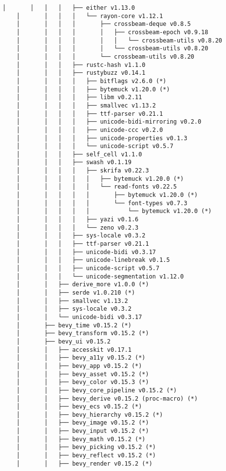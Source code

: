 \begin{lstlisting}[style=mystyle, caption={dependencias del proyecto}, label={lst:dependencias}]
    │       │   │   │   ├── either v1.13.0
    │       │   │   │   └── rayon-core v1.12.1
    │       │   │   │       ├── crossbeam-deque v0.8.5
    │       │   │   │       │   ├── crossbeam-epoch v0.9.18
    │       │   │   │       │   │   └── crossbeam-utils v0.8.20
    │       │   │   │       │   └── crossbeam-utils v0.8.20
    │       │   │   │       └── crossbeam-utils v0.8.20
    │       │   │   ├── rustc-hash v1.1.0
    │       │   │   ├── rustybuzz v0.14.1
    │       │   │   │   ├── bitflags v2.6.0 (*)
    │       │   │   │   ├── bytemuck v1.20.0 (*)
    │       │   │   │   ├── libm v0.2.11
    │       │   │   │   ├── smallvec v1.13.2
    │       │   │   │   ├── ttf-parser v0.21.1
    │       │   │   │   ├── unicode-bidi-mirroring v0.2.0
    │       │   │   │   ├── unicode-ccc v0.2.0
    │       │   │   │   ├── unicode-properties v0.1.3
    │       │   │   │   └── unicode-script v0.5.7
    │       │   │   ├── self_cell v1.1.0
    │       │   │   ├── swash v0.1.19
    │       │   │   │   ├── skrifa v0.22.3
    │       │   │   │   │   ├── bytemuck v1.20.0 (*)
    │       │   │   │   │   └── read-fonts v0.22.5
    │       │   │   │   │       ├── bytemuck v1.20.0 (*)
    │       │   │   │   │       └── font-types v0.7.3
    │       │   │   │   │           └── bytemuck v1.20.0 (*)
    │       │   │   │   ├── yazi v0.1.6
    │       │   │   │   └── zeno v0.2.3
    │       │   │   ├── sys-locale v0.3.2
    │       │   │   ├── ttf-parser v0.21.1
    │       │   │   ├── unicode-bidi v0.3.17
    │       │   │   ├── unicode-linebreak v0.1.5
    │       │   │   ├── unicode-script v0.5.7
    │       │   │   └── unicode-segmentation v1.12.0
    │       │   ├── derive_more v1.0.0 (*)
    │       │   ├── serde v1.0.210 (*)
    │       │   ├── smallvec v1.13.2
    │       │   ├── sys-locale v0.3.2
    │       │   └── unicode-bidi v0.3.17
    │       ├── bevy_time v0.15.2 (*)
    │       ├── bevy_transform v0.15.2 (*)
    │       ├── bevy_ui v0.15.2
    │       │   ├── accesskit v0.17.1
    │       │   ├── bevy_a11y v0.15.2 (*)
    │       │   ├── bevy_app v0.15.2 (*)
    │       │   ├── bevy_asset v0.15.2 (*)
    │       │   ├── bevy_color v0.15.3 (*)
    │       │   ├── bevy_core_pipeline v0.15.2 (*)
    │       │   ├── bevy_derive v0.15.2 (proc-macro) (*)
    │       │   ├── bevy_ecs v0.15.2 (*)
    │       │   ├── bevy_hierarchy v0.15.2 (*)
    │       │   ├── bevy_image v0.15.2 (*)
    │       │   ├── bevy_input v0.15.2 (*)
    │       │   ├── bevy_math v0.15.2 (*)
    │       │   ├── bevy_picking v0.15.2 (*)
    │       │   ├── bevy_reflect v0.15.2 (*)
    │       │   ├── bevy_render v0.15.2 (*)

\end{lstlisting}
